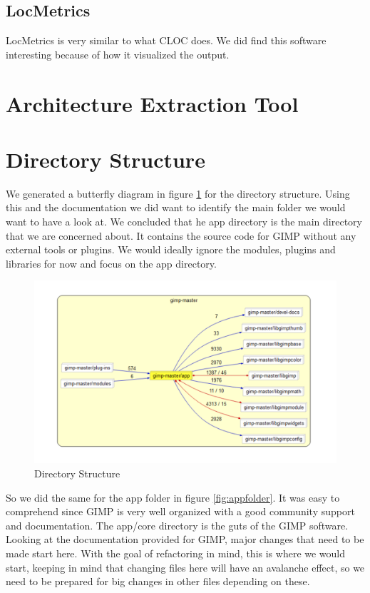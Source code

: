 \subsection{LocMetrics}
LocMetrics\cite{locmetrics} is very similar to what CLOC does. We did find this software interesting because of how it visualized the output.

\section{Architecture Extraction Tool}
\section{Directory Structure}
We generated a butterfly diagram in figure \ref{fig:direc} for the directory structure. Using this and the documentation we did want to identify the main folder we would want to have a look at. We concluded that he app directory is the main directory that we are concerned about. It contains the source code for GIMP without any external tools or plugins. We would ideally ignore the modules, plugins and libraries for now and focus on the app directory.
\begin{figure}
\centering
\includegraphics[width=1\textwidth]{directorybutterfly.png}
\caption{\label{fig:direc}Directory Structure}
\end{figure}
So we did the same for the app folder in figure \ref{fig:appfolder}. It was easy to comprehend since GIMP is very well organized with a good community support and documentation. The app/core directory is the guts of the GIMP software. Looking at the documentation provided for GIMP, major changes that need to be made start here. With the goal of refactoring in mind, this is where we would start, keeping in mind that changing files here will have an avalanche effect, so we need to be prepared for big changes in other files depending on these.
